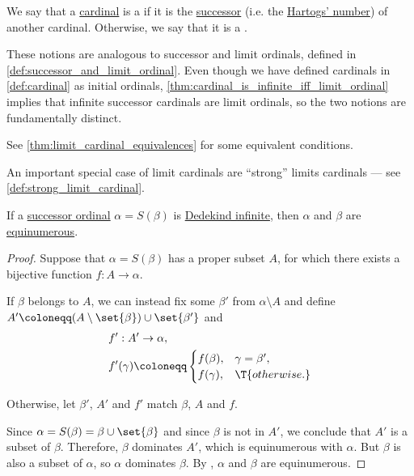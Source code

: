 \begin{definition}\label{def:successor_and_limit_cardinal}
  We say that a \hyperref[def:cardinal]{cardinal} is a  if it is the \hyperref[def:cardinal_successor]{successor} (i.e. the \hyperref[def:hartogs_number]{Hartogs' number}) of another cardinal. Otherwise, we say that it is a .
\end{definition}
\begin{comments}
  \item These notions are analogous to successor and limit ordinals, defined in \cref{def:successor_and_limit_ordinal}. Even though we have defined cardinals in \cref{def:cardinal} as initial ordinals, \cref{thm:cardinal_is_infinite_iff_limit_ordinal} implies that infinite successor cardinals are limit ordinals, so the two notions are fundamentally distinct.

  \item See \cref{thm:limit_cardinal_equivalences} for some equivalent conditions.

  \item An important special case of limit cardinals are \enquote{strong} limits cardinals --- see \cref{def:strong_limit_cardinal}.
\end{comments}

\begin{lemma}\label{thm:successor_ordinal}
  If a \hyperref[def:successor_and_limit_ordinal]{successor ordinal} \( \alpha = S(\beta) \) is \hyperref[def:dedekind_finiteness]{Dedekind infinite}, then \( \alpha \) and \( \beta \) are \hyperref[def:equinumerosity]{equinumerous}.
\end{lemma}
\begin{proof}
  Suppose that \( \alpha = S(\beta) \) has a proper subset \( A \), for which there exists a bijective function \( f: A \to \alpha \).

  If \( \beta \) belongs to \( A \), we can instead fix some \( \beta' \) from \( \alpha \setminus A \) and define \( A' \coloneqq (A \setminus \set{ \beta }) \cup \set{ \beta' } \) and
  \begin{equation*}
    \begin{aligned}
      &f': A' \to \alpha, \\
      &f'(\gamma) \coloneqq \begin{cases}
        f(\beta),  &\gamma = \beta', \\
        f(\gamma), &\T{otherwise.}
      \end{cases}
    \end{aligned}
  \end{equation*}

  Otherwise, let \( \beta' \), \( A' \) and \( f' \) match \( \beta \), \( A \) and \( f \).

  Since \( \alpha = S(\beta) = \beta \cup \set{ \beta } \) and since \( \beta \) is not in \( A' \), we conclude that \( A' \) is a subset of \( \beta \). Therefore, \( \beta \) dominates \( A' \), which is equinumerous with \( \alpha \). But \( \beta \) is also a subset of \( \alpha \), so \( \alpha \) dominates \( \beta \). By , \( \alpha \) and \( \beta \) are equinumerous.
\end{proof}

